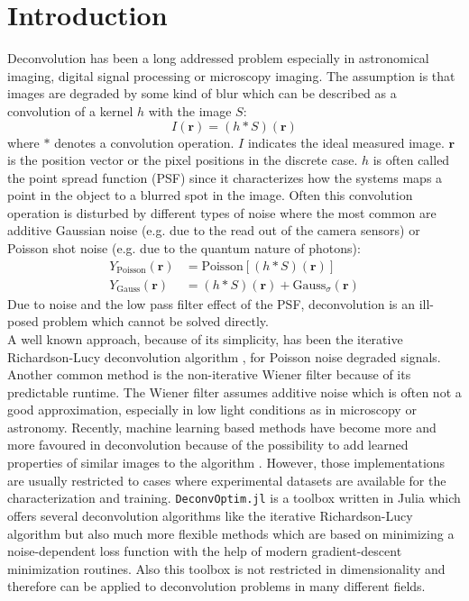 \documentclass{juliacon}
\begin{document}
\section{Introduction}
Deconvolution has been a long addressed problem especially in astronomical imaging, digital signal processing or microscopy imaging.
The assumption is that images are degraded by some kind of blur which can be described as a convolution of a kernel $h$ with the image $S$:
\begin{equation}
    I(\mathbf r) = (h * S)(\mathbf r)
\end{equation}
where $*$ denotes a convolution operation. $I$ indicates the ideal measured image. $\mathbf r$ is the position vector or the pixel positions in the discrete case.
$h$ is often called the point spread function (PSF) since it characterizes how the systems maps a point in the object to a blurred spot 
in the image.
Often this convolution operation is disturbed by different types of noise where the most common are additive Gaussian noise (e.g. due to the read out of the camera sensors) or Poisson shot noise (e.g. due to the quantum nature of photons):
\begin{align}
    Y_{\text{Poisson}}(\mathbf r) &= \text{Poisson}[(h * S)(\mathbf r)]\\
    Y_{\text{Gauss}}(\mathbf r) &= (h * S)(\mathbf r) + \text{Gauss}_{\sigma}(\mathbf r)
\end{align}
Due to noise and the low pass filter effect of the PSF, deconvolution is an ill-posed problem which cannot be solved directly.\\
A well known approach, because of its simplicity, has been the iterative Richardson-Lucy deconvolution algorithm 
\cite{Richardson:72}, \cite{lucy:74} for Poisson noise degraded signals.
Another common method is the non-iterative Wiener filter \cite{wiener2013extrapolation} because of its predictable runtime.
The Wiener filter assumes additive noise which is often not a good approximation, especially in low light conditions as in microscopy or astronomy. 
Recently, machine learning based methods have become more and more favoured in deconvolution because
of the possibility to add learned properties of similar images to the algorithm \cite{Kruse_2017_ICCV}.
However, those implementations are usually restricted to cases where experimental datasets are available for the characterization and training.
\verb|DeconvOptim.jl| is a toolbox written in Julia \cite{bezanson2017julia} which offers several deconvolution algorithms 
like the iterative Richardson-Lucy algorithm but also
much more flexible methods which are based on minimizing a 
noise-dependent loss function with the help of modern gradient-descent minimization routines. 
Also this toolbox is not restricted in dimensionality and therefore can be applied to deconvolution problems in many different fields.
\end{document}
